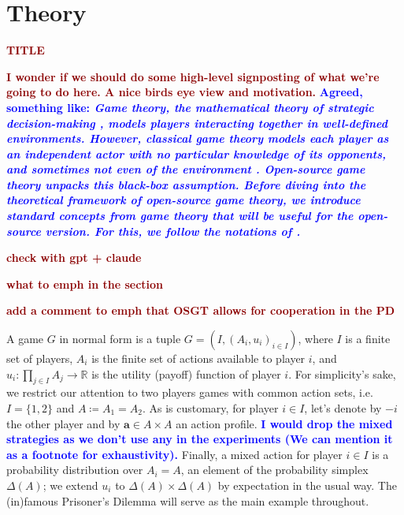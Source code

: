 \documentclass[twoside,11pt]{article}
\newcommand{\boldred}[1]{\textbf{\textcolor{darkred}{#1}}}
\newcommand{\boldblue}[1]{\textbf{\textcolor{blue}{#1}}}
\begin{document}
\newpage

\section{Theory}\label{sec:theory}

\boldred{TITLE}

\boldred{I wonder if we should do some high-level signposting of what we're going to do here. A nice birds eye view and motivation.}
\boldblue{Agreed, something like: \textit{Game theory, the mathematical theory of strategic decision-making \citep{game_theory}, models players interacting together in well-defined environments. However, classical game theory models each player as an independent actor with no particular knowledge of its opponents, and sometimes not even of the environment \citep{Harsanyi1,Harsanyi2,harsanyi3}. Open-source game theory unpacks this black-box assumption.
Before diving into the theoretical framework of open-source game theory, we introduce standard concepts from game theory that will be useful for the open-source version. For this, we follow the notations of \citet{duclaux2026proving}.}}


\boldred{check with gpt + claude}

\boldred{what to emph in the section}

\boldred{add a comment to emph that OSGT allows for cooperation in the PD}

A game $G$ in normal form is a tuple $G=(I, (A_i, u_i)_{i \in I})$, where $I$ is a finite set of players, $A_i$ is the finite set of actions available to player $i$, and $u_i:\prod_{j \in I} A_j \to \mathbb{R}$ is the utility (payoff) function of player $i$. For simplicity's sake, we restrict our attention to two players games with common action sets, i.e. $I=\{1,2\}$ and $A \coloneq A_1 = A_2$. As is customary, for player $i \in I$, let's denote by $-i$ the other player and by $\bm{a} \in A\times A$ an action profile. \boldblue{I would drop the mixed strategies as we don't use any in the experiments (We can mention it as a footnote for exhaustivity).} Finally, a mixed action for player $i \in I$ is a probability distribution over $A_i=A$, an element of the probability simplex $\Delta(A)$; we extend $u_i$ to $\Delta(A) \times \Delta(A)$  by expectation in the usual way. The (in)famous Prisoner's Dilemma will serve as the main example throughout.
\end{document}
